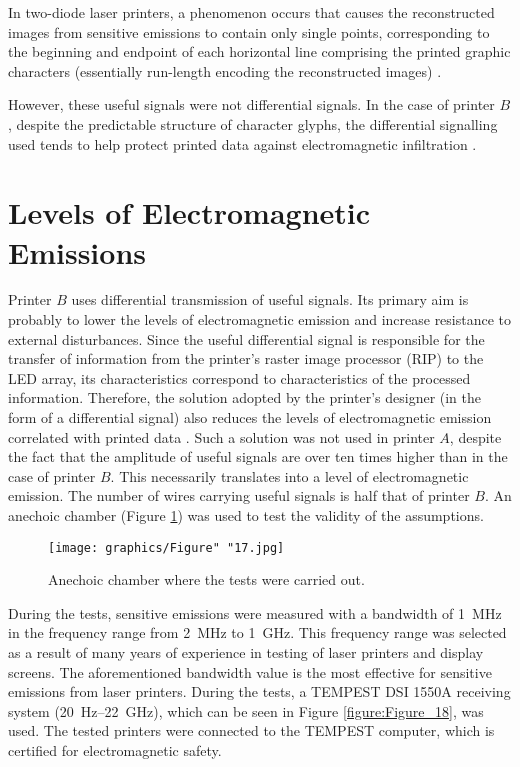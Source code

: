 \documentclass[12pt,a4paper]{article}
\begin{document}
In two-diode laser printers, a phenomenon occurs that causes the
reconstructed images from sensitive emissions to contain only single points,
corresponding to the beginning and endpoint of each horizontal line
comprising the printed graphic characters (essentially run-length encoding
the reconstructed images) \cite{Kubiak2014d}.

However, these useful signals were not differential signals. In the case of
printer $B$, despite the predictable structure of character glyphs, the
differential signalling used tends to help protect printed data against
electromagnetic infiltration \cite{Ketenci2017a}.

\section{Levels of Electromagnetic Emissions}

Printer $B$ uses differential transmission of useful signals. Its primary aim
is probably to lower the levels of electromagnetic emission and increase
resistance to external disturbances. Since the useful differential signal is
responsible for the transfer of information from the printer's raster image
processor (RIP) to the LED array, its characteristics correspond to
characteristics of the processed information. Therefore, the solution adopted
by the printer's designer (in the form of a differential signal) also reduces
the levels of electromagnetic emission correlated with printed data
\cite{Song2015a}. Such a solution was not used in printer $A$, despite the
fact that the amplitude of useful signals are over ten times higher than in
the case of printer $B$. This necessarily translates into a level of
electromagnetic emission. The number of wires carrying useful signals is half
that of printer $B$. An anechoic chamber (Figure \ref{figure:Figure_17}) was
used to test the validity of the assumptions.

\begin{figure}[ht]
    \centering
    \texttt{[image: graphics/Figure" "17.jpg]}
    \caption{Anechoic chamber where the tests were carried out.}
    \label{figure:Figure_17}
\end{figure}

During the tests, sensitive emissions were measured with a bandwidth of
\SI{1}{\mega\hertz} in the frequency range from \SI{2}{\mega\hertz} to
\SI{1}{\giga\hertz}. This frequency range was selected as a result of many
years of experience in testing of laser printers and display screens. The
aforementioned bandwidth value is the most effective for sensitive emissions
from laser printers. During the tests, a TEMPEST DSI 1550A receiving system
(\SI{20}{\hertz}--\SI{22}{\giga\hertz}), which can be seen in Figure
\ref{figure:Figure_18}, was used. The tested printers were connected to the
TEMPEST computer, which is certified for electromagnetic safety.
\end{document}
